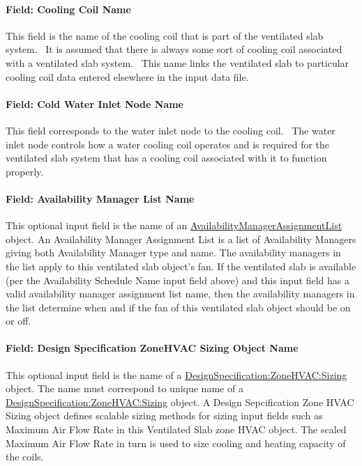 \paragraph{Field: Cooling Coil Name}\label{field-cooling-coil-name-001}

This field is the name of the cooling coil that is part of the ventilated slab system.~ It is assumed that there is always some sort of cooling coil associated with a ventilated slab system.~ This name links the ventilated slab to particular cooling coil data entered elsewhere in the input data file.

\paragraph{Field: Cold Water Inlet Node Name}\label{field-cold-water-inlet-node-name}

This field corresponds to the water inlet node to the cooling coil.~ The water inlet node controls how a water cooling coil operates and is required for the ventilated slab system that has a cooling coil associated with it to function properly.

\paragraph{Field: Availability Manager List Name}\label{field-availability-manager-list-name-001}

This optional input field is the name of an \hyperref[availabilitymanagerassignmentlist]{AvailabilityManagerAssignmentList} object. An Availability Manager Assignment List is a list of Availability Managers giving both Availability Manager type and name. The availability managers in the list apply to this ventilated slab object's fan. If the ventilated slab is available (per the Availability Schedule Name input field above) and this input field has a valid availability manager assignment list name, then the availability managers in the list determine when and if the fan of this ventilated slab object should be on or off.

\paragraph{Field: Design Specification ZoneHVAC Sizing Object Name}\label{field-design-specification-zonehvac-sizing-object-name}

This optional input field is the name of a \hyperref[designspecificationzonehvacsizing]{DesignSpecification:ZoneHVAC:Sizing} object. The name must correspond to unique name of a \hyperref[designspecificationzonehvacsizing]{DesignSpecification:ZoneHVAC:Sizing} object. A Design Sepcification Zone HVAC Sizing object defines scalable sizing methods for sizing input fields such as Maximum Air Flow Rate in this Ventilated Slab zone HVAC object. The scaled Maximum Air Flow Rate in turn is used to size cooling and heating capacity of the coils.

